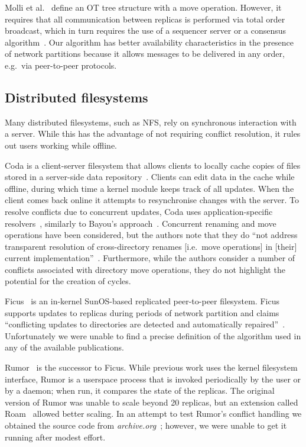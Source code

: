 \documentclass[sigplan,anonymous]{acmart}
\begin{document}
Molli et al.~\cite{Molli:2003cd} define an OT tree structure with a move operation.
However, it requires that all communication between replicas is performed via total order broadcast, which in turn requires the use of a sequencer server or a consensus algorithm~\cite{Chandra:1996cp}.
Our algorithm has better availability characteristics in the presence of network partitions because it allows messages to be delivered in any order, e.g.\ via peer-to-peer protocols.

\subsection{Distributed filesystems}\label{sec:filesystems}

Many distributed filesystems, such as NFS, rely on synchronous interaction with a server.
While this has the advantage of not requiring conflict resolution, it rules out users working while offline.

Coda is a client-server filesystem that allows clients to locally cache copies of files stored in a server-side data repository~\cite{kistler1992coda}. 
Clients can edit data in the cache while offline, during which time a kernel module keeps track of all updates. 
When the client comes back online it attempts to resynchronise changes with the server. 
To resolve conflicts due to concurrent updates, Coda uses application-specific resolvers~\cite{Kumar:1995wf}, similarly to Bayou's approach~\cite{Terry:1995dn}.
Concurrent renaming and move operations have been considered, but the authors note that they do ``not address transparent resolution of cross-directory renames [i.e.\ move operations] in [their] current implementation''~\cite{kumar1993log}.
Furthermore, while the authors consider a number of conflicts associated with directory move operations, they do not highlight the potential for the creation of cycles.

Ficus~\cite{Reiher:1994wh} is an in-kernel SunOS-based replicated peer-to-peer filesystem. 
Ficus supports updates to replicas during periods of network partition and claims ``conflicting updates to directories are detected and automatically repaired''~\cite{guy1990implementation}. 
Unfortunately we were unable to find a precise definition of the algorithm used in any of the available publications. 

Rumor~\cite{Guy:1999gy,RumorManual} is the successor to Ficus.
While previous work uses the kernel filesystem interface, Rumor is a userspace process that is invoked periodically by the user or by a daemon; when run, it compares the state of the replicas.
The original version of Rumor was unable to scale beyond 20 replicas, but an extension called Roam~\cite{Ratner:1999fh} allowed better scaling. 
In an attempt to test Rumor's conflict handling we obtained the source code from \emph{archive.org}~\cite{RumorSource}; however, we were unable to get it running after modest effort.
\end{document}
